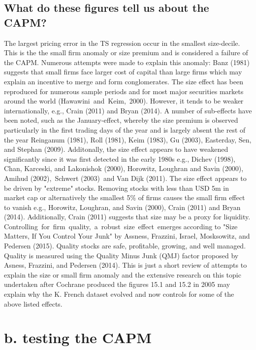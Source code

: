 \documentclass[]{article}
\begin{document}
\subsection*{What do these figures tell us about the CAPM?}	
The largest pricing error in the TS regression occur in the smallest size-decile. This is the the small firm anomaly or size premium and is considered a failure of the CAPM. Numerous attempts were made to explain this anomaly: Banz (1981) suggests that small firms face larger cost of capital than large firms which may explain an incentive to merge and form conglomerates. The size effect has been reproduced for numerous sample periods and for most major securities markets around the world (Hawawini and Keim, 2000). However, it tends to be weaker internationally, e.g., Crain (2011) and Bryan (2014). A number of sub-effects have been noted, such as the January-effect, whereby the size premium is observed particularly in the first trading days of the year and is largely absent the rest of the year Reinganum (1981), Roll (1981), Keim (1983), Gu (2003), Easterday, Sen, and Stephan (2009). Additonally, the size effect appears to have weakened significantly since it was first detected in the early 1980s e.g., Dichev (1998), Chan, Karceski, and Lakonishok (2000), Horowitz, Loughran and Savin (2000), Amihud (2002), Schwert (2003) and Van Dijk (2011). The size effect appears to be driven by "extreme" stocks. Removing stocks with less than USD 5m in market cap or alternatively the smallest 5\% of firms causes the small firm effect to vanish e.g., Horowitz, Loughran, and Savin (2000), Crain (2011) and Bryan (2014). Additionally, Crain (2011) suggests that size may be a proxy for liquidity. Controlling for firm quality, a robust size effect emerges according to "Size Matters, If You Control Your Junk" by Assness, Frazzini, Israel, Mosksowitz, and Pedersen (2015). Quality stocks are safe, profitable, growing, and well managed. Quality is measured using the Quality Minus Junk (QMJ) factor proposed by Asness, Frazzini, and Pedersen (2014). This is just a short review of attempts to explain the size or small firm anomaly and the extensive research on this topic undertaken after Cochrane produced the figures 15.1 and 15.2 in 2005 may explain why the K. French dataset evolved and now controls for some of the above listed effects.

\section*{b. testing the CAPM}
\end{document}
